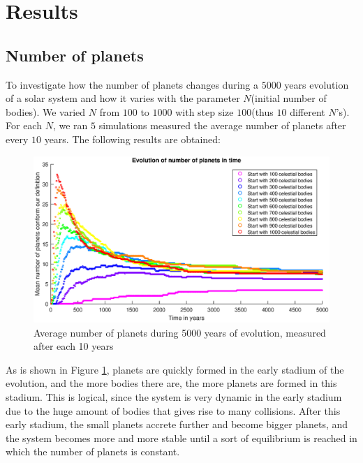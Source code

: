 \section{Results}

\subsection{Number of planets}
To investigate how the number of planets changes during a $5000$ years evolution of a solar system and how it varies with the parameter $N$(initial number of bodies). 
We varied $N$ from $100$ to $1000$ with step size $100$(thus $10$ different $N$'s). 
For each $N$, we ran $5$ simulations measured the average number of planets after every $10$ years. The following results are obtained:

\begin{figure}[H]
\centering
\includegraphics[scale=0.8]{APgrafiek.eps}
\caption{Average number of planets during 5000 years of evolution, measured after each 10 years}
    \label{fig:AantPlaneten}
\end{figure}

As is shown in Figure \ref{fig:AantPlaneten}, planets are quickly formed in the early stadium of the evolution, and the more bodies there are, the more planets are formed in this stadium. 
This is logical, since the system is very dynamic in the early stadium due to the huge amount of bodies that gives rise to many collisions. 
After this early stadium, the small planets accrete further and become bigger planets, and the system becomes more and more stable until a sort of equilibrium is reached in which the number of planets is constant.\\

